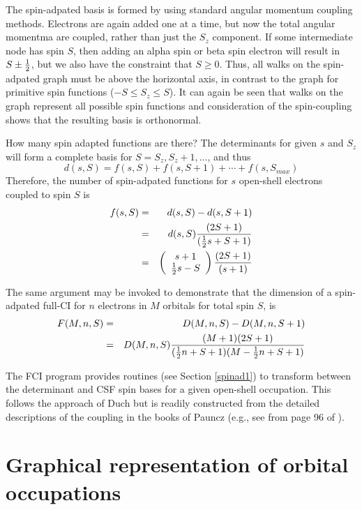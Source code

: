  The spin-adpated basis is formed by using standard angular momentum
coupling methods.  Electrons are again added one at a time, but now
the total angular momentma are coupled, rather than just the $S_z$
component.  If some intermediate node has spin $S$, then adding an
alpha spin or beta spin electron will result in $S\pm\frac{1}{2} $, but
we also have the constraint that $S \geq 0$.  Thus, all walks on the
spin-adpated graph must be above the horizontal axis, in contrast to
the graph for primitive spin functions ($-S \leq S_z \leq S$). It can
again be seen that walks on the graph represent all possible spin
functions and consideration of the spin-coupling shows that the
resulting basis is orthonormal.

How many spin adapted functions are there?  The determinants for given
$s$ and $S_z$ will form a complete basis for $S=S_z, S_z+1,\ldots$, and
thus
\begin{equation}
d(s,S) = f(s,S) + f(s,S+1) + \cdots + f(s,S_{max})
\end{equation}
Therefore, the number of spin-adpated functions for $s$ open-shell
electrons coupled to spin $S$ is
\begin{eqnarray}
f(s,S) & = & d(s,S) - d(s,S+1) \\
         & = & d(s,S) \frac{(2S + 1)}{(\frac{1}{2} s + S + 1)} \\
         & = & \left(\begin{array}{c} s+1 \\ \frac{1}{2} s - S \end{array}\right)\frac{(2S + 1)}{(s+1)}
\end{eqnarray}

The same argument may be invoked to demonstrate that the dimension
of a spin-adpated full-CI for $n$ electrons in $M$ orbitals for total
spin $S$, is
\begin{eqnarray}
 F(M,n,S) & = & D(M,n,S) - D(M,n,S+1) \\
          & = & D(M,n,S) \frac{(M+1)(2S+1)}{(\frac{1}{2} n + S + 1)(M-\frac{1}{2} n +S+1)}
\end{eqnarray}

The FCI program provides routines (see Section \ref{spinad1}) to
transform between the determinant and CSF spin bases for a given
open-shell occupation.  This follows the approach of Duch
\cite{duchspinad} but is readily constructed from the detailed
descriptions of the coupling in the books of Pauncz (e.g., see from
page 96 of \cite{paunczsym}).

\section{Graphical representation of orbital occupations}
\label{orbitalgraph}


